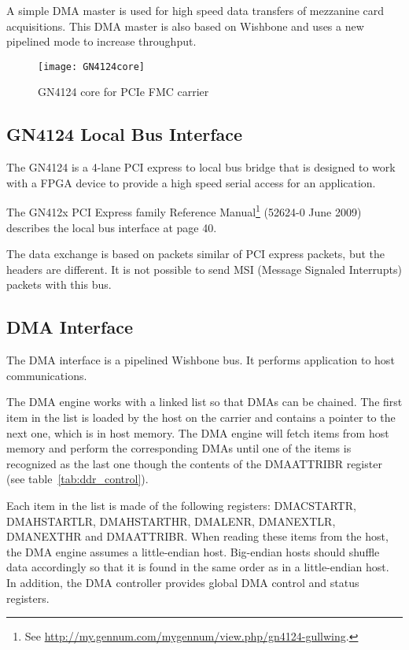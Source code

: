 \documentclass[10pt,a4paper]{cerndoc}
\begin{document}
  A simple DMA master is used for high speed data transfers of mezzanine card acquisitions. This DMA master is also based on Wishbone and uses a new pipelined mode to increase  throughput.
  
\begin{figure}[!ht]
	\centering
		\texttt{[image: GN4124core]}
	\caption{GN4124 core for PCIe FMC carrier}
	\label{fig:GCWWM}
\end{figure} 
    \subsection{GN4124 Local Bus Interface}
    
The GN4124 is a 4-lane PCI express to local bus bridge that is designed to work with a FPGA device to provide a high speed serial access for an application.
    
The GN412x PCI Express family Reference Manual\footnote{See \href{http://my.gennum.com/mygennum/view.php/gn4124-gullwing}{http://my.gennum.com/mygennum/view.php/gn4124-gullwing}.} (52624-0 June 2009) describes the local bus interface at page 40.

The data exchange is based on packets similar of PCI express packets, but the headers are different. It is not possible to send MSI (Message Signaled Interrupts) packets with this bus.
    
    \subsection{DMA Interface}
The DMA interface is a pipelined Wishbone bus. It performs application to host communications.

The DMA engine works with a linked list so that DMAs can be chained. The first item in the list is loaded by the host on the carrier and contains a pointer to the next one, which is in host memory. The DMA engine will fetch items from host memory and perform the corresponding DMAs until one of the items is recognized as the last one though the contents of the DMAATTRIBR register (see table~\ref{tab:ddr_control}). 

Each item in the list is made of the following registers: DMACSTARTR, DMAHSTARTLR, DMAHSTARTHR, DMALENR, DMANEXTLR, DMANEXTHR and DMAATTRIBR. When reading these items from the host, the DMA engine assumes a little-endian host. Big-endian hosts should shuffle data accordingly so that it is found in the same order as in a little-endian host. In addition, the DMA controller provides global DMA control and status registers.
\end{document}
